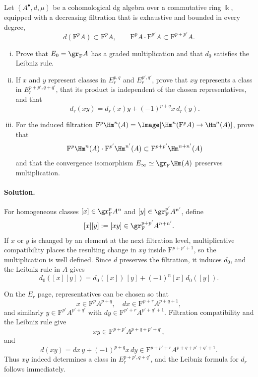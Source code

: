 Let $(A^\bullet,d,\mu)$ be a cohomological dg algebra over a commutative
ring $\Bbbk$, equipped with a decreasing filtration that is exhaustive and
bounded in every degree,
\[
	d(\mathrm{F}^pA)\subset\mathrm{F}^pA,
	\qquad
	\mathrm{F}^pA\cdot\mathrm{F}^{p'}A
	\subset\mathrm{F}^{p+p'}A.
\]
\begin{enumerate}[(i)]
	\item Prove that $E_0=\gr_{\mathrm F}A$ has a graded multiplication and
	that $d_0$ satisfies the Leibniz rule.
	\item If $x$ and $y$ represent classes in
	$E_r^{p,q}$ and $E_r^{p',q'}$, prove that $xy$ represents a class in
	$E_r^{p+p',q+q'}$, that its product is independent of the chosen
	representatives, and that
	\[
		d_r(xy)=d_r(x)y+(-1)^{p+q}x\,d_r(y).
	\]
	\item For the induced filtration
	$\mathrm{F}^p\Hm^n(A)=\Image[\Hm^n(\mathrm{F}^pA)\to\Hm^n(A)]$,
	prove that
	\[
		\mathrm{F}^p\Hm^n(A)\cdot\mathrm{F}^{p'}\Hm^{n'}(A)
		\subset\mathrm{F}^{p+p'}\Hm^{n+n'}(A)
	\]
	and that the convergence isomorphism
	$E_\infty\simeq\gr_{\mathrm F}\Hm(A)$ preserves multiplication.
\end{enumerate}

\paragraph{Solution.}
\hypertarget{o014.mastery.derived-spectral.002.sol08}{ }
For homogeneous classes
$[x]\in\gr^p_{\mathrm F}A^n$ and
$[y]\in\gr^{p'}_{\mathrm F}A^{n'}$, define
\[
	[x][y]:=[xy]\in\gr^{p+p'}_{\mathrm F}A^{n+n'}.
\]
If $x$ or $y$ is changed by an element at the next filtration level,
multiplicative compatibility places the resulting change in $xy$ inside
$\mathrm{F}^{p+p'+1}$, so the multiplication is well defined. Since $d$
preserves the filtration, it induces $d_0$, and the Leibniz rule in $A$
gives
\[
	d_0([x][y])=d_0([x])\,[y]+(-1)^n[x]\,d_0([y]).
\]

On the $E_r$ page, representatives can be chosen so that
\[
	x\in\mathrm{F}^pA^{p+q},\quad
	dx\in\mathrm{F}^{p+r}A^{p+q+1},
\]
and similarly
$y\in\mathrm{F}^{p'}A^{p'+q'}$ with
$dy\in\mathrm{F}^{p'+r}A^{p'+q'+1}$. Filtration compatibility and the
Leibniz rule give
\[
	xy\in\mathrm{F}^{p+p'}A^{p+q+p'+q'},
\]
and
\[
	d(xy)=dx\,y+(-1)^{p+q}x\,dy
	\in\mathrm{F}^{p+p'+r}A^{p+q+p'+q'+1}.
\]
Thus $xy$ indeed determines a class in $E_r^{p+p',q+q'}$, and the Leibniz
formula for $d_r$ follows immediately.

